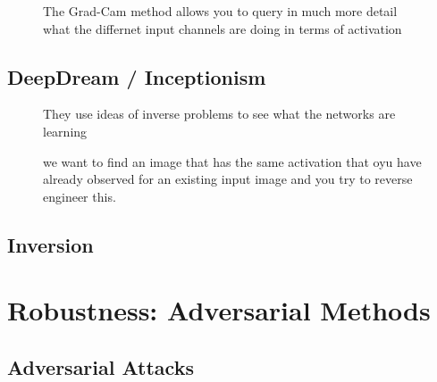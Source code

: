 \documentclass[11pt]{article}
\begin{document}
\begin{figure}[H]
    \centering
    \caption{The Grad-Cam method allows you to query in much more detail what the differnet input channels are doing in terms of activation}
\end{figure}

\subsection{DeepDream / Inceptionism}

\begin{figure}[H]
    \centering
    \caption{They use ideas of inverse problems to see what the networks are learning}
\end{figure}

\begin{figure}[H]
    \centering
    \caption{we want to find an image that has the same activation that oyu have already observed for an existing input image and you try to reverse engineer this.}
\end{figure}

\subsection{Inversion}

\begin{figure}[H]
    \centering
\end{figure}

\section{Robustness: Adversarial Methods}

\begin{figure}[H]
    \centering
\end{figure}

\subsection{Adversarial Attacks}
\end{document}
